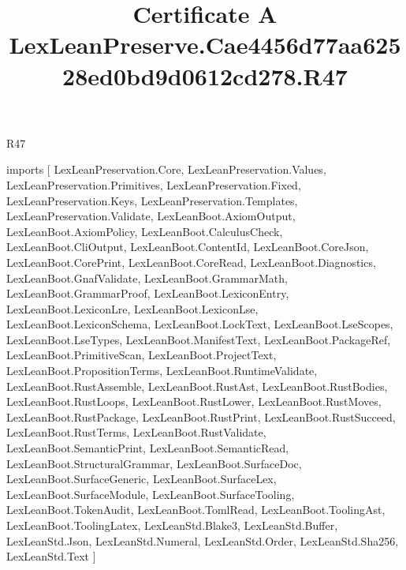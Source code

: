 \begin{lexlean}{R47}
\title{Certificate A LexLeanPreserve.Cae4456d77aa62528ed0bd9d0612cd278.R47}
\begin{coremodule}
imports [
  LexLeanPreservation.Core,
  LexLeanPreservation.Values,
  LexLeanPreservation.Primitives,
  LexLeanPreservation.Fixed,
  LexLeanPreservation.Keys,
  LexLeanPreservation.Templates,
  LexLeanPreservation.Validate,
  LexLeanBoot.AxiomOutput,
  LexLeanBoot.AxiomPolicy,
  LexLeanBoot.CalculusCheck,
  LexLeanBoot.CliOutput,
  LexLeanBoot.ContentId,
  LexLeanBoot.CoreJson,
  LexLeanBoot.CorePrint,
  LexLeanBoot.CoreRead,
  LexLeanBoot.Diagnostics,
  LexLeanBoot.GnafValidate,
  LexLeanBoot.GrammarMath,
  LexLeanBoot.GrammarProof,
  LexLeanBoot.LexiconEntry,
  LexLeanBoot.LexiconLre,
  LexLeanBoot.LexiconLse,
  LexLeanBoot.LexiconSchema,
  LexLeanBoot.LockText,
  LexLeanBoot.LseScopes,
  LexLeanBoot.LseTypes,
  LexLeanBoot.ManifestText,
  LexLeanBoot.PackageRef,
  LexLeanBoot.PrimitiveScan,
  LexLeanBoot.ProjectText,
  LexLeanBoot.PropositionTerms,
  LexLeanBoot.RuntimeValidate,
  LexLeanBoot.RustAssemble,
  LexLeanBoot.RustAst,
  LexLeanBoot.RustBodies,
  LexLeanBoot.RustLoops,
  LexLeanBoot.RustLower,
  LexLeanBoot.RustMoves,
  LexLeanBoot.RustPackage,
  LexLeanBoot.RustPrint,
  LexLeanBoot.RustSucceed,
  LexLeanBoot.RustTerms,
  LexLeanBoot.RustValidate,
  LexLeanBoot.SemanticPrint,
  LexLeanBoot.SemanticRead,
  LexLeanBoot.StructuralGrammar,
  LexLeanBoot.SurfaceDoc,
  LexLeanBoot.SurfaceGeneric,
  LexLeanBoot.SurfaceLex,
  LexLeanBoot.SurfaceModule,
  LexLeanBoot.SurfaceTooling,
  LexLeanBoot.TokenAudit,
  LexLeanBoot.TomlRead,
  LexLeanBoot.ToolingAst,
  LexLeanBoot.ToolingLatex,
  LexLeanStd.Blake3,
  LexLeanStd.Buffer,
  LexLeanStd.Json,
  LexLeanStd.Numeral,
  LexLeanStd.Order,
  LexLeanStd.Sha256,
  LexLeanStd.Text
]


\end{coremodule}
\end{lexlean}
